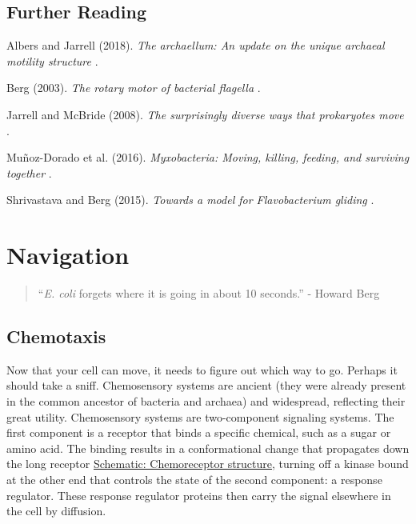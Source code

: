 \documentclass[]{tufte-book}
\begin{document}
\hypertarget{further-reading-5}{%
\section{Further Reading}\label{further-reading-5}}

Albers and Jarrell (2018). \emph{The archaellum: An update on the unique archaeal motility structure} \citep{albers2018}.

Berg (2003). \emph{The rotary motor of bacterial flagella} \citep{berg2003}.

Jarrell and McBride (2008). \emph{The surprisingly diverse ways that prokaryotes move} \citep{jarrell2008}.

Muñoz-Dorado et al. (2016). \emph{Myxobacteria: Moving, killing, feeding, and surviving together} \citep{munoz-dorado2016}.

Shrivastava and Berg (2015). \emph{Towards a model for Flavobacterium gliding} \citep{shrivastava2015}.

\hypertarget{navigation}{%
\chapter{Navigation}\label{navigation}}

\begin{quote}
``\emph{E. coli} forgets where it is going in about 10 seconds.''
- Howard Berg \citep{berg1988}
\end{quote}

\hypertarget{chemotaxis}{%
\section{Chemotaxis}\label{chemotaxis}}

Now that your cell can move, it needs to figure out which way to go. Perhaps it should take a sniff. Chemosensory systems are ancient (they were already present in the common ancestor of bacteria and archaea) and widespread, reflecting their great utility. Chemosensory systems are two-component signaling systems. The first component is a receptor that binds a specific chemical, such as a sugar or amino acid. The binding results in a conformational change that propagates down the long receptor \protect\hyperlink{Chemoreceptor_structure}{Schematic: Chemoreceptor structure}, turning off a kinase bound at the other end that controls the state of the second component: a response regulator. These response regulator proteins then carry the signal elsewhere in the cell by diffusion.
\end{document}
